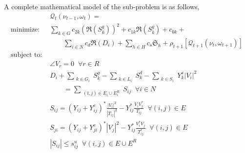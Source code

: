 \documentclass{juliacon}
\begin{document}
A complete mathematical model of the sub-problem is as follows,
\begin{subequations} \label{AC_OPF}
\begin{align}
%
& \mathcal{Q}_t(\nu_{t-1},\omega_t) = \nonumber \\
%
%
\mbox{minimize: } & \sum_{k \in G} c_{2k} (\Re(S^g_k))^2 + c_{1k}\Re(S^g_k) + c_{0k} + \nonumber\\
& \qquad \sum_{i \in N} c_{d} \Re(D_i) +  \sum_{h \in H} c_{s} \mathfrak{S}_h + \rho_{t+1}[\mathcal{Q}_{t+1}(\nu_{t}, \omega_{t+1})] \label{eq_objective}\\
%
\mbox{subject to: } & \nonumber \\
& \angle V_{r} = 0  \;\; \forall r \in R \label{eq_ref_bus}\\
& D_i+ \sum_{\substack{k \in G_i}} S^g_k - \sum_{\substack{k \in L_i}} S^d_k - \sum_{\substack{k \in S_i}} Y^s_k |V_i|^2 \nonumber \\ 
& \qquad = \sum_{\substack{(i,j)\in E_i \cup E_i^R}} S_{ij} \;\; \forall i\in N \label{eq_kcl_shunt} \\
& S_{ij} = \left( Y_{ij} + Y^c_{ij}\right)^* \frac{|V_i|^2}{|{T}_{ij}|^2} - Y^*_{ij} \frac{V_i V^*_j}{{T}_{ij}} \;\; \forall (i,j)\in E \label{eq_power_from}\\
& S_{ji} = \left( Y_{ij} + Y^c_{ji} \right)^* |V_j|^2 - Y^*_{ij} \frac{V^*_i V_j}{{T}^*_{ij}} \;\; \forall (i,j)\in E \label{eq_power_to}\\
& |S_{ij}| \leq s^u_{ij} \;\; \forall (i,j) \in E \cup E^R \label{eq_thermal_limit}\\

\end{align}
\end{subequations}
\end{document}
